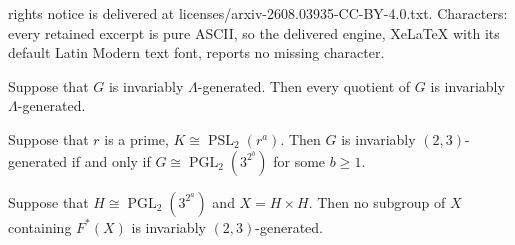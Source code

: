 \documentclass[10pt,a4paper]{amsart}
\DeclareMathOperator{\PGL}{PGL}
\DeclareMathOperator{\PSL}{PSL}
\begin{document}
rights notice is delivered at licenses/arxiv-2608.03935-CC-BY-4.0.txt. Characters: every retained excerpt is pure ASCII, so the delivered engine, XeLaTeX with its default Latin Modern text font, reports no missing character.
\begin{lemma}\label{lem:quotients} Suppose that $G$ is invariably $\Lambda$-generated. Then every quotient of $G$ is invariably $\Lambda$-generated.
\end{lemma}

\begin{proposition}\label{lem:psl2}
 Suppose that $r$ is a prime, $K \cong \PSL_2(r^a)$. Then $G$ is invariably $(2,3)$-generated if and only if $G \cong \PGL_2(3^{2^b})$ for some $b\ge 1$.  \end{proposition}

\begin{lemma}\label{lem:no repeated factors}
Suppose that $H \cong \PGL_2(3^{2^a})$ and   $X= H\times H$. Then no subgroup of $X$ containing $F^*(X)$ is invariably $(2,3)$-generated.
\end{lemma}
\end{document}
